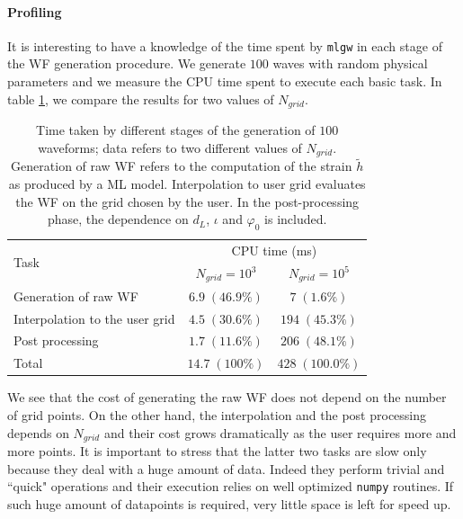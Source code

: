 \paragraph{Profiling}
It is interesting to have a knowledge of the time spent by \texttt{mlgw} in each stage of the WF generation procedure.
We generate $100$ waves with random physical parameters and we measure the CPU time spent to execute each basic task.
In table \ref{tab:profiling}, we compare the results for two values of $N_{grid}$.
\begin{table}
	\def\arraystretch{1.5}
	\begin{tabular}{ l c c }
		\multirow{2}{*}{Task}& \multicolumn{2}{c}{CPU time (ms)}\\
			&$N_{grid} = 10^3$	& $N_{grid} = 10^5$\\
	\hline \hline
		 Generation of raw WF 			& $6.9 \; (46.9\%)$	& $7 \; (1.6\%)$ \\ 
	\hline
		 Interpolation to the user grid & $4.5 \; (30.6\%)$	& $194 \; (45.3\%)$ \\ 
	\hline
		 Post processing 				& $1.7 \; (11.6\%)$	& $206 \; (48.1\%)$ \\
	\hline
		 Total							& $14.7 \; (100\%)$ &  $428 \; (100.0\%)$ \\
	\hline \hline
	\end{tabular}
	\caption{
Time taken by different stages of the generation of $100$ waveforms; data refers to two different values of $N_{grid}$.
Generation of raw WF refers to the computation of the strain $\tilde{h}$ as produced by a ML model. Interpolation to user grid evaluates the WF on the grid chosen by the user. In the post-processing phase, the dependence on $d_L$, $\iota$ and $\varphi_0$ is included.
}
	\label{tab:profiling}
\end{table}
\par
We see that the cost of generating the raw WF does not depend on the number of grid points. On the other hand, the interpolation and the post processing depends on $N_{grid}$ and their cost grows dramatically as the user requires more and more points.
It is important to stress that the latter two tasks are slow only because they deal with a huge amount of data. Indeed they perform trivial and ``quick" operations and their execution relies on well optimized \texttt{numpy} routines.
If such huge amount of datapoints is required, very little space is left for speed up.
\par

